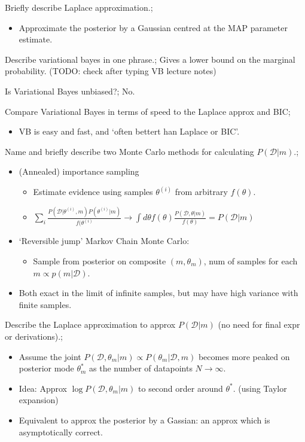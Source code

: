 \documentclass{article}
\begin{document}
Briefly describe Laplace approximation.; \begin{itemize} \item Approximate the posterior by a Gaussian centred at the MAP parameter estimate.  \end{itemize}

Describe variational bayes in one phrase.; Gives a lower bound on the marginal probability. (TODO: check after typing VB lecture notes)

Is Variational Bayes unbiased?; No.

Compare Variational Bayes in terms of speed to the Laplace approx and BIC; \begin{itemize} \item VB is easy and fast, and `often bettert han Laplace or BIC'.  \end{itemize}

Name and briefly describe two Monte Carlo methods for calculating $P(\mathcal{D}|m)$.; \begin{itemize} \item (Annealed) importance sampling \begin{itemize} \item Estimate evidence using samples $\theta^{(i)}$ from arbitrary $f(\theta)$.  \item $\sum_i \frac{P(\mathcal{D}|\theta^{(i)}, m)P(\theta^{(i)}|m)}{f(\theta^{(i)}}\rightarrow \int d\theta f(\theta)\frac{P(\mathcal{D},\theta|m)}{f(\theta)}=P(\mathcal{D}|m)$ \end{itemize} \item `Reversible jump' Markov Chain Monte Carlo: \begin{itemize} \item Sample from posterior on composite $(m, \theta_m)$, num of samples for each $m\propto p(m|\mathcal{D})$.  \end{itemize} \item Both exact in the limit of infinite samples, but may have high variance with finite samples.  \end{itemize}

Describe the Laplace approximation to approx $P(\mathcal{D}|m)$ (no need for final expr or derivations).; \begin{itemize} \item Assume the joint $P(\mathcal{D},\theta_m|m)\propto P(\theta_m|\mathcal{D},m)$ becomes more peaked on posterior mode $\theta^*_m$ as the number of datapoints $N\rightarrow\infty$.  \item Idea: Approx $\log P(\mathcal{D},\theta_m|m)$ to second order around $\theta^*$. (using Taylor expansion) \item Equivalent to approx the posterior by a Gassian: an approx which is asymptotically correct.  \end{itemize}
\end{document}
